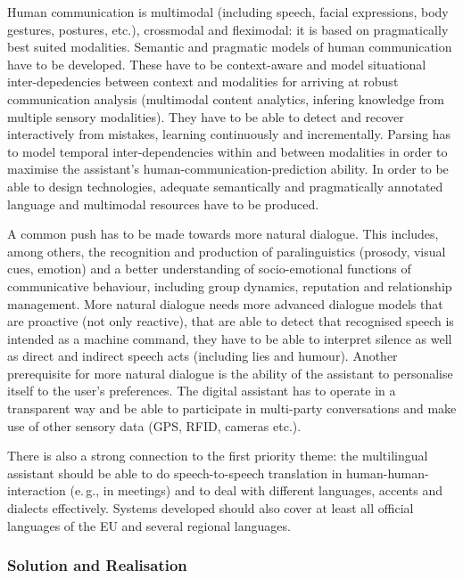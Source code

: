 \documentclass[10pt, plain]{../../metanetpaper}
\begin{document}
\begin{multicols}{2}
Human communication is multimodal (including speech, facial expressions, body gestures, postures, etc.), crossmodal and fleximodal: it is based on pragmatically best suited modalities. Semantic and pragmatic models of human communication have to be developed. These have to be context-aware and model situational inter-depedencies between context and modalities for arriving at robust communication analysis (multimodal content analytics, infering knowledge from multiple sensory modalities). They have to be able to detect and recover interactively from mistakes, learning continuously and incrementally. Parsing has to model temporal inter-dependencies within and between modalities in order to maximise the assistant's human-communication-prediction ability. In order to be able to design technologies, adequate semantically and pragmatically annotated language and multimodal resources have to be produced.

A common push has to be made towards more natural dialogue. This includes, among others, the recognition and production of paralinguistics (prosody, visual cues, emotion) and a better understanding of socio-emotional functions of communicative behaviour, including group dynamics, reputation and relationship management. More natural dialogue needs more advanced dialogue models that are proactive (not only reactive), that are able to detect that recognised speech is intended as a machine command, they have to be able to interpret silence as well as direct and indirect speech acts (including lies and humour). Another prerequisite for more natural dialogue is the ability of the assistant to personalise itself to the user's preferences. The digital assistant has to operate in a transparent way and be able to participate in multi-party conversations and make use of other sensory data (GPS, RFID, cameras etc.).

There is also a strong connection to the first priority theme: the multilingual assistant should be able to do speech-to-speech translation in human-human-interaction (e.\,g., in meetings) and to deal with different languages, accents and dialects effectively. Systems developed should also cover at least all official languages of the EU and several regional languages.

\subsubsection{Solution and Realisation}
\label{sec:solut-techn-real-pt3}


\end{multicols}
\end{document}
